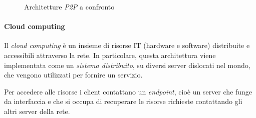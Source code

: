 \begin{figure}[h]
    \centering
    \hfill
    \hfill
    \caption{Architetture \emph{P2P} a confronto}
\end{figure}

\paragraph{Cloud computing}
Il \emph{cloud computing} è un insieme di risorse IT (hardware e software)
distribuite e accessibili attraverso la rete. In particolare, questa architettura
viene implementata come un \emph{sistema distribuito}, su diversi server dislocati
nel mondo, che vengono utilizzati per fornire un servizio.

Per accedere alle risorse i client contattano un \emph{endpoint}, cioè un server
che funge da interfaccia e che si occupa di recuperare le risorse
richieste contattando gli altri server della rete.

